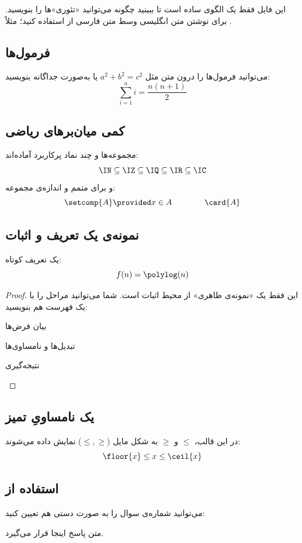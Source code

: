 
این فایل فقط یک الگوی ساده است تا ببینید چگونه می‌توانید «تئوری»‌ها را بنویسید.
برای نوشتن متن انگلیسی وسط متن فارسی از  استفاده کنید؛ مثلاً .

\subsection{فرمول‌ها}
می‌توانید فرمول‌ها را درون متن مثل \(a^2+b^2=c^2\) یا به‌صورت جداگانه بنویسید:
\[
	\sum_{i=1}^{n} i = \frac{n(n+1)}{2}
\]

\subsection{کمی میان‌برهای ریاضی}
مجموعه‌ها و چند نماد پرکاربرد آماده‌اند:
\[
	\IN \subseteq \IZ \subseteq \IQ \subseteq \IR \subseteq \IC
\]
و برای متمم و اندازه‌ی مجموعه:
\[
	\setcomp{A} \provided x \in A \qquad\qquad \card{A}
\]

\subsection{نمونه‌ی یک تعریف و اثبات}
یک تعریف کوتاه:
\[
	f(n) = \polylog(n)
\]

\begin{proof}
این فقط یک «نمونه‌ی ظاهری» از محیط اثبات است. شما می‌توانید مراحل را با یک فهرست هم بنویسید:
\begin{ابجد}
\item بیان فرض‌ها
\item تبدیل‌ها و نامساوی‌ها
\item نتیجه‌گیری
\end{ابجد}
\end{proof}

\subsection{یک نامساویِ تمیز}
در این قالب، \(\leq\) و \(\geq\) به شکل مایل (\(\leqslant,\geqslant\)) نمایش داده می‌شوند:
\[
	\floor{x} \le x \le \ceil{x}
\]

\subsection{استفاده از }
می‌توانید شماره‌ی سوال را به صورت دستی هم تعیین کنید:

متن پاسخ اینجا قرار می‌گیرد.

